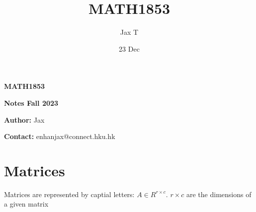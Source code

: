 \documentclass{article}
\title{MATH1853}
\author{Jax T}
\date{23 Dec}
\begin{document}
\begin{titlepage}
    \null\vfill %
    
    \centering
    \Huge\textbf{MATH1853}
    
    \vspace{0.1cm}
    \Large\textbf{Notes Fall 2023}
    
    \vspace{1cm}
    \normalsize\textbf{Author:} Jax
    
    \normalsize\textbf{Contact:} enhanjax@connect.hku.hk
    \vfill %
\end{titlepage}


\section{Matrices}
Matrices are represented 
by captial letters: $A\in R^{r\times c}$.
$r \times c$ are the dimensions of a given matrix
\end{document}
